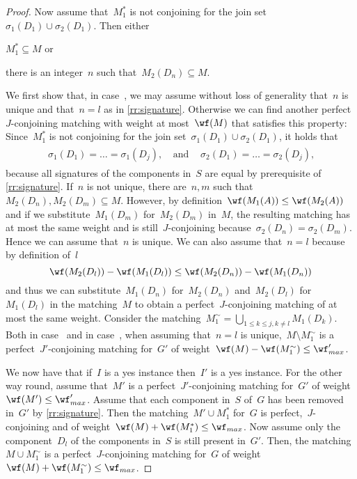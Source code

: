 \begin{proof}
Now assume that~$M_1^*$ is not conjoining for the join set~$\sigma_1(D_{1}) \cup \sigma_2(D_{1})$. Then either
\begin{asparaenum}
\item $M_1^* \subseteq M$ or \label{enu:sig11}
\item there is an integer~$n$ such that~$M_2(D_{n}) \subseteq M$. \label{enu:sig12}
\end{asparaenum}
We first show that, in case~, we may assume without loss of generality that~$n$ is unique and that~$n = l$ as in \autoref{rr:signature}. Otherwise we can find another perfect~$J$-conjoining matching with weight at most~$\wf(M)$ that satisfies this property: Since~$M_1^*$ is not conjoining for the join set~$\sigma_1(D_{1}) \cup \sigma_2(D_{1})$, it holds that
\begin{align*}
  \begin{split}
    \sigma_1(D_{1}) = \ldots = \sigma_1(D_{j}) \text{,}
  \end{split}
&\text{and}
&
  \begin{split}
    \sigma_2(D_{1}) = \ldots = \sigma_2(D_{j}) \text{,}
  \end{split}
\end{align*}
because all signatures of the components in~$S$ are equal by prerequisite of \autoref{rr:signature}. If~$n$ is not unique, there are~$n, m$ such that~$M_2(D_{{n}}), M_2(D_{{m}}) \subseteq M$. However, by definition~$\wf(M_1(A)) \leq \wf(M_2(A))$ and if we substitute~$M_1(D_{m})$ for~$M_2(D_{{m}})$ in~$M$, the resulting matching has at most the same weight and is still~$J$-conjoining because~$\sigma_2(D_{{n}}) = \sigma_2(D_{{m}})$. Hence we can assume that~$n$ is unique. We can also assume that~$n = l$ because by definition of~$l$~\[\wf(M_2(D_{l}))-\wf(M_1(D_{l})) \leq \wf(M_2(D_{n}))-\wf(M_1(D_{n}))\] and thus we can substitute~$M_1(D_{n})$ for~$M_2(D_{n})$ and~$M_2(D_{l})$ for~$M_1(D_{l})$ in the matching~$M$ to obtain a perfect~$J$-conjoining matching of at most the same weight. Consider the matching~$M_1^\sim= \bigcup_{1 \leq k \leq j, k \neq l}M_1(D_{k})$. Both in case~ and in case~, when assuming that~$n =l$ is unique,~$M \setminus M_1^\sim$ is a perfect~$J'$-conjoining matching for~$G'$ of weight~$\wf(M) - \wf(M_1^\sim) \leq \wf_{max}'$.

  We now have that if~$I$ is a yes instance then~$I'$ is a yes instance. For the other way round, assume that~$M'$ is a perfect~$J'$-conjoining matching for~$G'$ of weight~$\wf(M') \leq \wf_{max}'$. Assume that each component in~$S$ of~$G$ has been removed in~$G'$ by \autoref{rr:signature}. Then the matching~$M' \cup M_1^*$ for~$G$ is perfect,~$J$-conjoining and of weight~$\wf(M) + \wf(M_1^*) \leq \wf_{max}$. Now assume only the component~$D_{l}$ of the components in~$S$ is still present in~$G'$. Then, the matching~$M \cup M_1^\sim$ is a perfect~$J$-conjoining matching for~$G$ of weight~$\wf(M) + \wf(M_1^\sim) \leq \wf_{max}$.
\end{proof}
